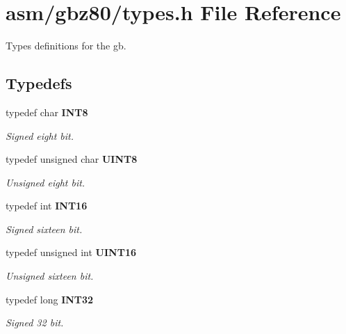\section{asm/gbz80/types.h File Reference}
\label{asm/gbz80/types.h}
Types definitions for the gb. 


\subsection*{Typedefs}
\begin{CompactItemize}
\item 
\label{asm/gbz80/types.h_a1}
typedef char {\bf INT8}
\begin{CompactList}\small\item\em Signed eight bit.\item\end{CompactList}

\item 
\label{asm/gbz80/types.h_a2}
typedef unsigned char {\bf UINT8}
\begin{CompactList}\small\item\em Unsigned eight bit.\item\end{CompactList}

\item 
\label{asm/gbz80/types.h_a3}
typedef int {\bf INT16}
\begin{CompactList}\small\item\em Signed sixteen bit.\item\end{CompactList}

\item 
\label{asm/gbz80/types.h_a4}
typedef unsigned int {\bf UINT16}
\begin{CompactList}\small\item\em Unsigned sixteen bit.\item\end{CompactList}

\item 
\label{asm/gbz80/types.h_a5}
typedef long {\bf INT32}
\begin{CompactList}\small\item\em Signed 32 bit.\item\end{CompactList}


\end{CompactItemize}
